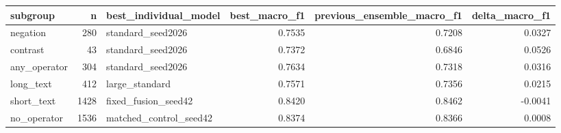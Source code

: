 \begin{tabular}{lrlrrr}
\toprule
subgroup & n & best\_individual\_model & best\_macro\_f1 & previous\_ensemble\_macro\_f1 & delta\_macro\_f1 \\
\midrule
negation & 280 & standard\_seed2026 & 0.7535 & 0.7208 & 0.0327 \\
contrast & 43 & standard\_seed2026 & 0.7372 & 0.6846 & 0.0526 \\
any\_operator & 304 & standard\_seed2026 & 0.7634 & 0.7318 & 0.0316 \\
long\_text & 412 & large\_standard & 0.7571 & 0.7356 & 0.0215 \\
short\_text & 1428 & fixed\_fusion\_seed42 & 0.8420 & 0.8462 & -0.0041 \\
no\_operator & 1536 & matched\_control\_seed42 & 0.8374 & 0.8366 & 0.0008 \\
\bottomrule
\end{tabular}
